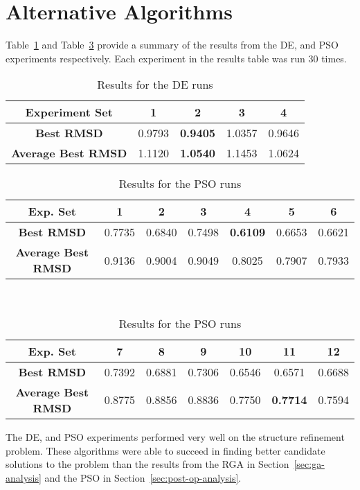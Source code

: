 \section{Alternative Algorithms}

Table~\ref{table:ea-de-results} and Table~\ref{table:ea-pso-results} provide a summary of the results from the DE, and PSO experiments respectively. Each experiment in the results table was run 30 times.

\begin{table}
	\centering
	\begin{tabular}{ | >{\bfseries}c | c | c | c | c | }
		\hline
		Experiment Set & 1 & 2 & 3 & 4 \\ \hline
		Best RMSD & 0.9793 & \textbf{0.9405} & 1.0357 & 0.9646 \\ \hline
		Average Best RMSD & 1.1120 & \textbf{1.0540} & 1.1453 & 1.0624 \\ \hline
	\end{tabular}
	\caption{Results for the DE runs}
	\label{table:ea-de-results}
\end{table}

\begin{table}
	\centering
	\begin{tabular}{ | >{\bfseries}c | c | c | c | c | c | c | }
		\hline
		Exp. Set & 1 & 2 & 3 & 4 & 5 & 6 \\ \hline
		Best RMSD & 0.7735 & 0.6840 & 0.7498 & \textbf{0.6109} & 0.6653 & 0.6621 \\ \hline
		Average Best RMSD & 0.9136 & 0.9004 & 0.9049 & 0.8025 & 0.7907 & 0.7933 \\ \hline
	\end{tabular}
	\\
	\vspace{3 mm}
	\begin{tabular}{ | >{\bfseries}c | c | c | c | c | c | c | }
		\hline
		Exp. Set & 7 & 8 & 9 & 10 & 11 & 12 \\ \hline
		Best RMSD & 0.7392 & 0.6881 & 0.7306 & 0.6546 & 0.6571 & 0.6688 \\ \hline
		Average Best RMSD & 0.8775 & 0.8856 & 0.8836 & 0.7750 & \textbf{0.7714} & 0.7594 \\ \hline
	\end{tabular}
	\caption{Results for the PSO runs}
	\label{table:ea-pso-results}
\end{table}

The DE, and PSO experiments performed very well on the structure refinement problem. These algorithms were able to succeed in finding better candidate solutions to the problem than the results from the RGA in Section~\ref{sec:ga-analysis} and the PSO in Section~\ref{sec:post-op-analysis}.

